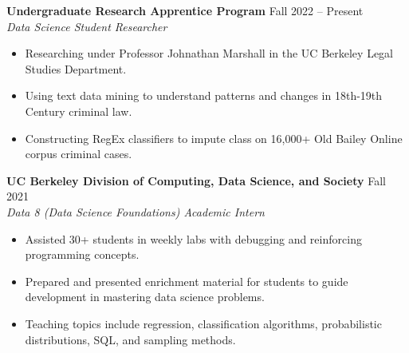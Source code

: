 \documentclass{article}
\begin{document}
    \begin{adjustwidth}{1em}{1em}


        \textbf{Undergraduate Research Apprentice Program} \hfill Fall 2022 -- Present
        \\ \textit{Data Science Student Researcher}
        \begin{itemize}
            \item Researching under Professor Johnathan Marshall in the UC Berkeley Legal Studies Department.
            \item Using text data mining to understand patterns and changes in 18th-19th Century criminal law.
            \item Constructing RegEx classifiers to impute class on 16,000+ Old Bailey Online corpus criminal cases.
        \end{itemize}

        \vspace{1mm}

        \textbf{UC Berkeley Division of Computing, Data Science, and Society} \hfill Fall 2021
        \\ \textit{Data 8 (Data Science Foundations) Academic Intern}
        \begin{itemize}
            \item Assisted 30+ students in weekly labs with debugging and reinforcing programming concepts.
            \item Prepared and presented enrichment material for students to guide development in mastering data science problems.
            \item Teaching topics include regression, classification algorithms, probabilistic distributions, SQL, and sampling methods.

        \end{itemize}

        

        
    \end{adjustwidth}

    

\end{document}

